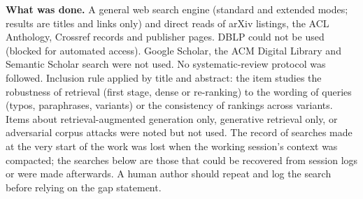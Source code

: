 \documentclass[
  11pt,
]{article}
\begin{document}
\textbf{What was done.} A general web search engine (standard and
extended modes; results are titles and links only) and direct reads of
arXiv listings, the ACL Anthology, Crossref records and publisher pages.
DBLP could not be used (blocked for automated access). Google Scholar,
the ACM Digital Library and Semantic Scholar search were not used. No
systematic-review protocol was followed. Inclusion rule applied by title
and abstract: the item studies the robustness of retrieval (first stage,
dense or re-ranking) to the wording of queries (typos, paraphrases,
variants) or the consistency of rankings across variants. Items about
retrieval-augmented generation only, generative retrieval only, or
adversarial corpus attacks were noted but not used. The record of
searches made at the very start of the work was lost when the working
session's context was compacted; the searches below are those that could
be recovered from session logs or were made afterwards. A human author
should repeat and log the search before relying on the gap statement.
\end{document}
